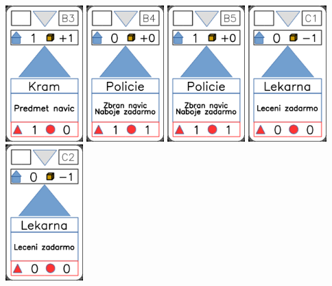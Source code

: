 \documentclass[a4paper]{article}
\begin{document}
	\includegraphics[width=3.0cm]{img-3_7}
	\includegraphics[width=3.0cm]{img-3_8}
	\includegraphics[width=3.0cm]{img-3_9}
	\includegraphics[width=3.0cm]{img-3_10}
	\includegraphics[width=3.0cm]{img-3_11}
\end{document}
